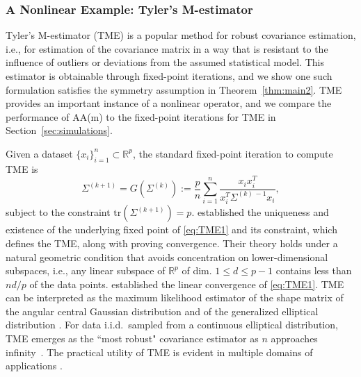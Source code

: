 \documentclass[11pt]{article}
\newcommand{\R}{\mathbb{R}}
\begin{document}
\subsubsection{A Nonlinear Example: Tyler's M-estimator}\label{sec:TME}
Tyler's M-estimator (TME) \citep{Tyler1987} is a popular method for robust covariance estimation, i.e., for estimation of the covariance matrix in a way that is resistant to the influence of outliers or deviations from the assumed statistical model. 
This estimator is obtainable through fixed-point iterations, and we show one such formulation satisfies the symmetry assumption in Theorem~\ref{thm:main2}. TME provides an important instance of a nonlinear operator, and we compare the performance of AA(m) to the fixed-point iterations for TME in Section~\ref{sec:simulations}. 

Given a dataset $\{x_i\}_{i=1}^n\subset\R^p$, the standard fixed-point iteration to compute TME is  
\begin{equation}\label{eq:TME1}
\Sigma^{(k+1)}=G(\Sigma^{(k)}):=\frac{p}{n}\sum_{i=1}^n\frac{x_i x_i^T}{x_i^T\Sigma^{(k)\,-1}x_i},
\end{equation}
subject to the constraint $\text{tr}(\Sigma^{(k+1)})=p$. \cite{KentTyler1988} established the uniqueness and existence of the underlying fixed point 
of \eqref{eq:TME1} and its constraint, which defines the TME, along with proving convergence. Their theory holds under a natural geometric condition that avoids concentration on lower-dimensional subspaces, i.e., any linear subspace
of $\mathbb{R}^p$ of 
dim. 
$1 \leq d \leq p-1$ 
contains less than ${nd}/{p}$ of the data points.
\cite{FranksMoitra2020} established the linear convergence of \eqref{eq:TME1}.
TME can be interpreted as the maximum likelihood estimator of the shape matrix of
the angular central Gaussian distribution \citep{tyler1987statistical} and of the generalized elliptical
distribution \citep{frahm2}. For data i.i.d.~sampled from a continuous elliptical distribution, TME emerges as the ``most robust" covariance estimator as $n$ approaches infinity~\citep{Tyler1987}. The practical utility of TME is evident in multiple domains of applications \citep{chen+2011,FrahmJaekel2007,OllilaKoivunen2003,OllilaTyler2012}. 
\end{document}
